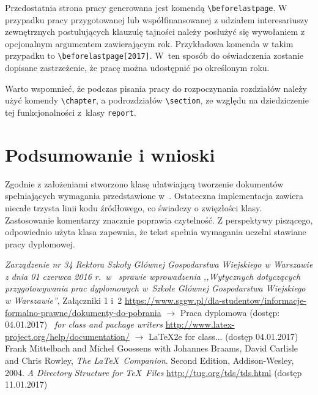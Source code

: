 \documentclass{SGGW-thesis}
\begin{document}
Przedostatnia strona pracy generowana jest komendą \verb|\beforelastpage|. W przypadku pracy przygotowanej lub współfinansowanej z udziałem interesariuszy zewnętrznych postulujących klauzulę tajności należy posłużyć się wywołaniem z opcjonalnym argumentem zawierającym rok. Przykładowa komenda w takim przypadku to \verb|\beforelastpage[2017]|. W~ten sposób do oświadczenia zostanie dopisane zastrzeżenie, że pracę można udostępnić po określonym roku.

Warto wspomnieć, że podczas pisania pracy do rozpoczynania rozdziałów należy użyć komendy \verb|\chapter|, a podrozdziałów \verb|\section|, ze względu na dziedziczenie tej funkcjonalności z~klasy \verb|report|.


\chapter{Podsumowanie i wnioski}
Zgodnie z założeniami stworzono klasę ułatwiającą tworzenie dokumentów spełniających wymagania przedstawione w~\cite{wymagania}. Ostateczna implementacja zawiera niecałe trzysta linii kodu źródłowego, co świadczy o zwięzłości klasy. Zastosowanie komentarzy znacznie poprawia czytelność. Z perspektywy piszącego, odpowiednio użyta klasa zapewnia, że tekst spełnia wymagania uczelni stawiane pracy dyplomowej.


\begin{thebibliography}{9}
\textit{Zarządzenie nr 34 Rektora Szkoły Głównej Gospodarstwa Wiejskiego w Warszawie z dnia 01 czerwca 2016 r.\ w~ sprawie wprowadzenia ,,Wytycznych dotyczących przygotowywania prac dyplomowych w~Szkole Głównej Gospodarstwa Wiejskiego w Warszawie''}, Załączniki 1 i~2
\url{https://www.sggw.pl/dla-studentow/informacje-formalno-prawne/dokumenty-do-pobrania}
$\rightarrow$ Praca dyplomowa (dostęp: 04.01.2017)
\textit{\LaTeXe\ for class and package writers} \url{http://www.latex-project.org/help/documentation/} $\rightarrow$ LaTeX2e for class... (dostęp 04.01.2017)
Frank Mittelbach and Michel Goossens with Johannes Braams, David Carlisle and Chris Rowley,
\textit{The \LaTeX\ Companion}. Second Edition,
Addison-Wesley, 2004.
\textit{A Directory Structure for \TeX\ Files} \url{http://tug.org/tds/tds.html} (dostęp 11.01.2017)
\end{thebibliography}

\beforelastpage
\end{document}
